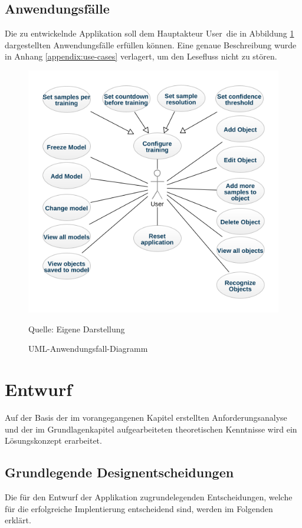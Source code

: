 \documentclass[oneside]{ausarbeitung}
\begin{document}
\section{Anwendungsfälle}
Die zu entwickelnde Applikation soll dem Hauptakteur \glqq User\grqq\ die in Abbildung \ref{fig:usecase-diagram} dargestellten Anwendungsfälle erfüllen können. Eine genaue Beschreibung wurde in Anhang \ref{appendix:use-cases} verlagert, um den Lesefluss nicht zu stören. 
\begin{figure}[hptb]
	\centering
	\includegraphics[height=0.6\textheight]{images/usecase-diagram.png}
	\caption{UML-Anwendungsfall-Diagramm} Quelle: Eigene Darstellung
	\label{fig:usecase-diagram}
\end{figure}
\chapter{Entwurf}
\label{cha:Entwurf}
Auf der Basis der im vorangegangenen Kapitel erstellten Anforderungsanalyse 
und der im Grundlagenkapitel aufgearbeiteten theoretischen Kenntnisse 
wird ein Lösungskonzept erarbeitet.
\section{Grundlegende Designentscheidungen}
Die für den Entwurf der Applikation zugrundelegenden Entscheidungen, welche für die erfolgreiche Implentierung entscheidend sind, werden im Folgenden erklärt.
\end{document}
